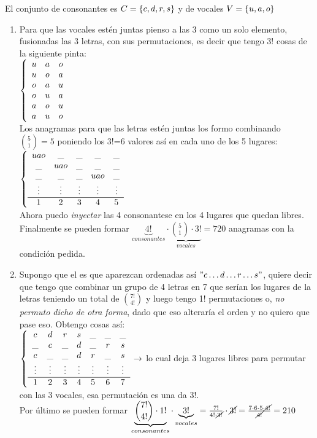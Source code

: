 \documentclass[12pt,a4paper, spanish]{article}
\begin{document}
El conjunto de consonantes es $C = \left\{ c,d,r,s \right\}$ y de vocales $V = \left\{ u,a,o \right\}$
\begin{enumerate}[label=\roman*)]
	\item  Para que las vocales estén juntas pienso a las 3 como un solo elemento, fusionadas las 3 letras, con sus permutaciones,
	      es decir que tengo 3! cosas de la siguiente pinta:\\
	      $\llave{c c c} %
		      {
			      u & a & o\\
			      u & o & a\\
			      o & a & u\\
			      o & u & a\\
			      a & o & u\\
			      a & u & o\\
		      } $\\
	      Los anagramas para que las letras estén juntas los formo combinando $\binom{5}{1} = 5$ poniendo los 3!=6 valores así en cada uno de los
	      5 lugares:\\
	      $\llave{c c c c c} %
		      {
			      uao & \_ & \_ & \_ & \_\\
			      \_& uao  & \_ & \_ & \_\\
			      \_ & \_ & \_ & uao &  \_\\
			      \vdots & \vdots & \vdots & \vdots & \vdots \\ \hline
			      1 & 2 & 3 & 4 & 5
		      } $\\
	      Ahora puedo \textit{inyectar} las 4 consonantese en los 4 lugares que quedan libres. Finalmente se pueden formar
	      $\underbrace{4!}_{consonantes} \cdot \underbrace{ \binom{5}{1} \cdot 3!}_{vocales} =  720$ anagramas con la condición pedida.\\

	\item Supongo que el  es que aparezcan ordenadas así $"c \dots d \dots r \dots s"$, quiere decir que tengo que combinar
	      un grupo de 4 letras en 7 que serían los lugares de la letras teniendo un total de $\binom{7!}{4!}$ y luego tengo 1! permutaciones o, \textit{no permuto
		      dicho de otra forma},    dado que eso alteraría el orden y no quiero que pase eso. Obtengo cosas así:\\
	      $\llave{c c c c c c c c} %
		      {
			      c & d & r & s &\_ & \_ & \_\\
			      \_ & c & \_ & d & \_ & r & s\\
			      c & \_ & \_ & d & r & \_ & s\\
			      \vdots & \vdots &\vdots & \vdots & \vdots & \vdots & \vdots \\ \hline
			      1 & 2 & 3 & 4 & 5 & 6 & 7
		      } \to
	      $ lo cual deja 3 lugares libres para permutar con las 3 vocales, esa permutación es una  da $3!$.\\
	      Por último se pueden formar $\underbrace{\binom{7!}{4!}\cdot 1!}_{consonantes} \cdot \underbrace{3!}_{vocales} =
		      \frac{7!}{4!\cdot \cancel{3!}} \cdot \cancel{3!} = \frac{7 \cdot 6 \cdot 5 \cdot \cancel{4!}}{\cancel{4!}} = 210$



\end{enumerate}
\end{document}
